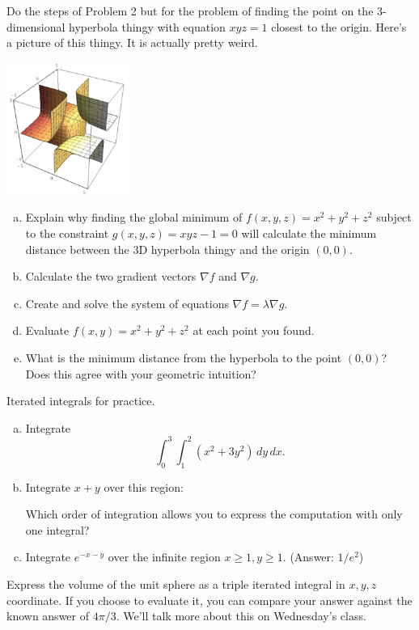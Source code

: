 \documentclass[11pt,oneside]{amsart}
\theoremstyle{definition}
\begin{document}
  \begin{problem}
    Do the steps of Problem 2 but for the problem of finding the point on the 3-dimensional hyperbola thingy with equation $xyz=1$ closest to the origin. Here's a picture of this thingy. It is actually pretty weird.
    \begin{center}
      \includegraphics[width=4cm]{d8_3dthingy.png}
    \end{center}
    \begin{enumerate}[(a)]
      \item Explain why finding the global minimum of $f(x,y,z)=x^2+y^2+z^2$ subject to the constraint $g(x,y,z)=xyz-1=0$ will calculate the minimum distance between the 3D hyperbola thingy and the origin $(0,0)$.
      \item Calculate the two gradient vectors $\nabla f$ and $\nabla g$.
      \item Create and solve the system of equations $\nabla f=\lambda\nabla g$.
      \item Evaluate $f(x,y)=x^2+y^2+z^2$ at each point you found.
      \item What is the minimum distance from the hyperbola to the point $(0,0)$? Does this agree with your geometric intuition?
    \end{enumerate}
  \end{problem}

  \begin{problem}
    Iterated integrals for practice.
    \begin{enumerate}[(a)]
      \item Integrate
      \[\int_0^3\int_1^2(x^2+3y^2)\,dy\,dx.\]
      \item Integrate $x+y$ over this region:
      \begin{center}
      \end{center}
      Which order of integration allows you to express the computation with only one integral?
      \item Integrate $e^{-x-y}$ over the infinite region $x\geq 1,y\geq 1$. (Answer: $1/e^2$)
    \end{enumerate}
  \end{problem}

  \begin{problem}[Challenge]
    Express the volume of the unit sphere as a triple iterated integral in $x,y,z$ coordinate. If you choose to evaluate it, you can compare your answer against the known answer of $4\pi/3$. We'll talk more about this on Wednesday's class.
  \end{problem}
\end{document}
